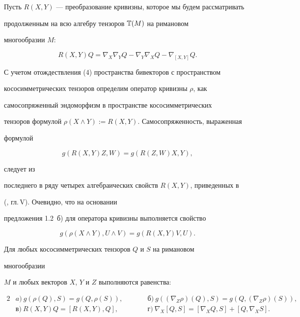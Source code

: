Пусть $R(X,Y)$ --- преобразование кривизны, которое мы будем рассматривать


продолженным на всю алгебру тензоров $\Bbb T(M)$ на римановом


многообразии $M$:


\begin{equation}


R(X,Y)Q=\nabla_X\nabla_YQ-\nabla_Y\nabla_XQ-\nabla_{[X,Y]}Q.


\end{equation}


С учетом отождествления (4) пространства бивекторов с пространством


кососимметрических тензоров определим оператор кривизны $\rho$, как


самосопряженный эндоморфизм в пространстве кососимметрических


тензоров формулой $\rho(X\land Y):=R(X,Y)$. Самосопряженность, выраженная


формулой


\begin{equation}


g(R(X,Y)Z,W)=g(R(Z,W)X,Y),


\end{equation}


следует из


последнего в ряду четырех алгебраических свойств $R(X,Y)$, приведенных в


(\cite{Kob1}, гл.\,V). Очевидно, что на основании


предложения 1.2~б) для оператора кривизны выполняется свойство


\begin{equation}


g(\rho(X\land Y),U\land V)=g(R(X,Y)V,U).


\end{equation}





\begin{props} Для любых кососимметрических тензоров $Q$ и $S$ на римановом


многообразии


$M$ и любых векторов $X$, $Y$ и $Z$ выполняются равенства:


\begin{alignat*}{2}


&a)\ g(\rho(Q),S)=g(Q,\rho(S)), &\qquad &б)\ g((\nabla_Z\rho)(Q),S)=


g(Q,(\nabla_Z\rho)(S)),\\


&в) \ R(X,Y)Q=[R(X,Y),Q], &\qquad &г) \ \nabla_X[Q,S]=[\nabla_XQ,S]+[Q,\nabla_XS].


\end{alignat*}


\end{props}





